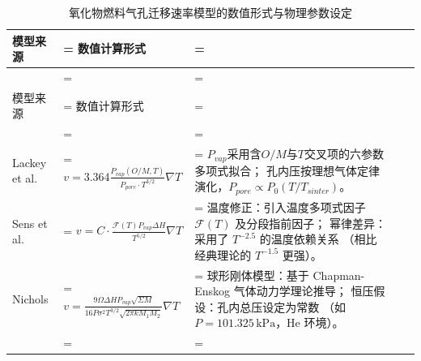 \begin{xltabular}{\textwidth}{@{}
		>{\centering\arraybackslash}m{2.4cm}
		>{\hsize\linewidth=\hsize
			\centering\arraybackslash}X
		>{\hsize\linewidth=\hsize
			\RaggedRight\arraybackslash}X
		@{}}
	
	\caption{氧化物燃料气孔迁移速率模型的数值形式与物理参数设定}
	\label{tab:pore_migration_formulations} \\
	
	\toprule
	模型来源
	&
	数值计算形式
	&
	\\
	\midrule
	\endfirsthead
	
	\\
	
	\toprule
	模型来源
	&
	数值计算形式
	&
	\\
	\midrule
	\endhead
	
	\midrule
	\\
	\endfoot
	
	\bottomrule
	\endlastfoot
	
	
	Lackey et al. \cite{lackeyPorosityActinideRedistribution1972} &
	$\displaystyle v = 3.364 \frac{P_{vap}(O/M, T)}
	{P_{pore} \cdot T^{3/2}} \nabla T$ &
	$P_{vap}$采用含$O/M$与$T$交叉项的六参数多项式拟合；\newline
	孔内压按理想气体定律演化，$P_{pore}\propto P_0(T/T_{sinter})$。
	\\
	\addlinespace
	
	Sens et al. \cite{sensKineticsPoreMovement1972} &
	$\displaystyle v = C \cdot
	\frac{\mathcal{F}(T) P_{vap} \Delta H}{T^{5/2}} \nabla T$ &
	温度修正：引入温度多项式因子 $\mathcal{F}(T)$ 及分段指前因子；\newline
	幂律差异：采用了 $T^{-2.5}$ 的温度依赖关系
	（相比经典理论的 $T^{-1.5}$ 更强）。
	\\
	\addlinespace
	
	Nichols\cite{nicholsTheoryColumnarGrain1967} &
	$\displaystyle v =
	\frac{9 \Omega \Delta H P_{vap} \sqrt{\Sigma M}}
	{16 P \sigma^2 T^{3/2} \sqrt{2\pi k M_1 M_2}}
	\nabla T$ &
	球形刚体模型：基于 Chapman-Enskog 气体动力学理论推导；\newline
	恒压假设：孔内总压设定为常数
	（如 $P=101.325\,\mathrm{kPa}$，He 环境）。
	\\
	\addlinespace
	

\end{xltabular}
